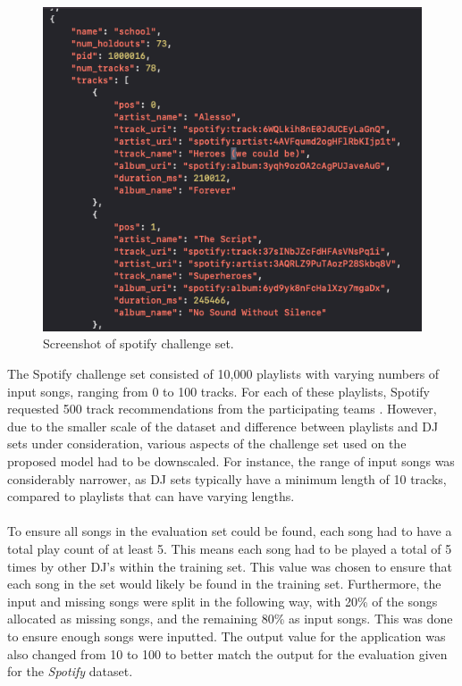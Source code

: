 \begin{figure}[H]
	\includegraphics[scale=0.5]{images/spotify_challenge_set}
	\centering
	\caption{Screenshot of spotify challenge set. \citep{aicrowd_aicrowd_2023}} 
\end{figure}

The Spotify challenge set consisted of 10,000 playlists with varying numbers of input songs, ranging from 0 to 100 tracks. For each of these playlists, Spotify requested 500 track recommendations from the participating teams \citep{aicrowd_aicrowd_2023}. However, due to the smaller scale of the dataset and difference between playlists and DJ sets under consideration, various aspects of the  challenge set used on the proposed model had to be downscaled. For instance, the range of input songs was considerably narrower, as DJ sets typically have a minimum length of 10 tracks, compared to playlists that can have varying lengths.
\\
\\
To ensure all songs in the evaluation set could be found, each song had to have a total play count of at least 5. This means each song had to be played a total of 5 times by other DJ's within the training set. This value was chosen to ensure that each song in the set would likely be found in the training set. Furthermore, the input and missing songs were split in the following way, with 20\% of the songs allocated as missing songs, and the remaining 80\% as input songs. This was done to ensure enough songs were inputted. The output value for the application was also changed from 10 to 100 to better match the output for the evaluation given for the \textit{Spotify} dataset.

